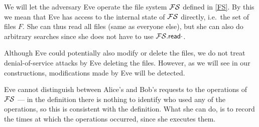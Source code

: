 We will let the adversary Eve operate the file system \(\FS\) defined in 
\cref{FS}.
By this we mean that Eve has access to the internal state of \(\FS\) directly, 
i.e.\ the set of files \(F\).
She can thus read all files (same as everyone else), but she can also do 
arbitrary searches since she does not have to use \(\fsread{\cdot}\).

Although Eve could potentially also modify or delete the files, we do not treat 
denial-of-service attacks by Eve deleting the files.
However, as we will see in our constructions, modifications made by Eve will be 
detected.

Eve cannot distinguish between Alice's and Bob's requests to the operations of 
\(\FS\) --- in the definition there is nothing to identify who used any of the 
operations, so this is consistent with the definition.
What she can do, is to record the times at which the operations occurred, since 
she executes them.

